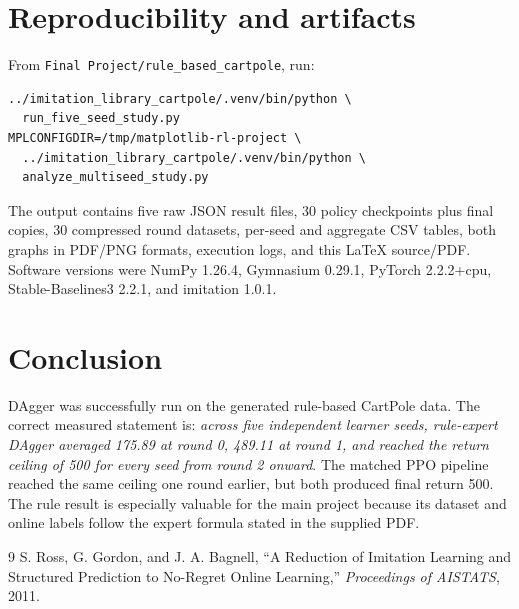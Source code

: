 \documentclass[11pt]{article}
\begin{document}
\section{Reproducibility and artifacts}

From \texttt{Final Project/rule\_based\_cartpole}, run:
\begin{verbatim}
../imitation_library_cartpole/.venv/bin/python \
  run_five_seed_study.py
MPLCONFIGDIR=/tmp/matplotlib-rl-project \
  ../imitation_library_cartpole/.venv/bin/python \
  analyze_multiseed_study.py
\end{verbatim}

The output contains five raw JSON result files, 30 policy checkpoints plus final copies, 30 compressed round datasets, per-seed and aggregate CSV tables, both graphs in PDF/PNG formats, execution logs, and this LaTeX source/PDF. Software versions were NumPy 1.26.4, Gymnasium 0.29.1, PyTorch 2.2.2+cpu, Stable-Baselines3 2.2.1, and imitation 1.0.1.

\section{Conclusion}

DAgger was successfully run on the generated rule-based CartPole data. The correct measured statement is: \emph{across five independent learner seeds, rule-expert DAgger averaged 175.89 at round 0, 489.11 at round 1, and reached the return ceiling of 500 for every seed from round 2 onward}. The matched PPO pipeline reached the same ceiling one round earlier, but both produced final return 500. The rule result is especially valuable for the main project because its dataset and online labels follow the expert formula stated in the supplied PDF.

\begin{thebibliography}{9}
\bibitem{ross2011}
S. Ross, G. Gordon, and J. A. Bagnell,
``A Reduction of Imitation Learning and Structured Prediction to No-Regret Online Learning,''
\emph{Proceedings of AISTATS}, 2011.
\end{thebibliography}
\end{document}
